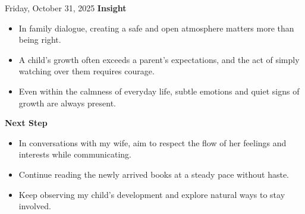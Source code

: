 \documentclass[dvipdfmx, autodetect-engine, aspectratio=169, 10.5pt]{beamer}
\begin{document}
\begin{frame}{Friday, October 31, 2025}
	\textbf{Insight}  
	\begin{itemize}
		\item In family dialogue, creating a safe and open atmosphere matters more than being right.  
		\item A child's growth often exceeds a parent's expectations, and the act of simply watching over them requires courage.  
		\item Even within the calmness of everyday life, subtle emotions and quiet signs of growth are always present.  
	\end{itemize}

	\textbf{Next Step}  
	\begin{itemize}
		\item In conversations with my wife, aim to respect the flow of her feelings and interests while communicating.  
		\item Continue reading the newly arrived books at a steady pace without haste.  
		\item Keep observing my child's development and explore natural ways to stay involved.  
	\end{itemize}
\end{frame}
\end{document}
